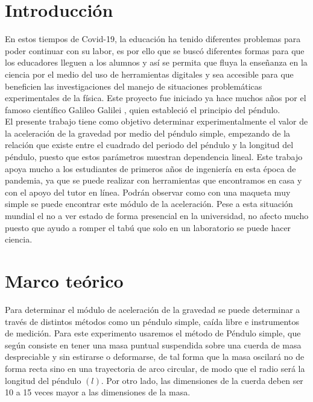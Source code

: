 \documentclass[10pt,a4paper]{article}
\begin{document}
\begin{multicols}{2}
	\section{Introducción}
En estos tiempos de Covid-19, la educación ha tenido diferentes problemas para poder continuar con su labor, es por ello que se buscó diferentes formas para que los educadores lleguen a los alumnos y así se permita que fluya la enseñanza en la ciencia por el medio del uso de herramientas digitales y sea accesible para que beneficien las investigaciones del manejo de situaciones problemáticas experimentales de la física. Este proyecto fue iniciado ya hace muchos años por el famoso científico Galileo Galilei \cite{cespedesprimer}, quien estableció el principio del péndulo.\\
El presente trabajo tiene como objetivo determinar experimentalmente el valor de la aceleración de la gravedad por medio del péndulo simple, empezando de la relación que existe entre el cuadrado del periodo del péndulo y la longitud del péndulo, puesto que estos parámetros muestran dependencia lineal. Este trabajo apoya mucho a los estudiantes de primeros años de ingeniería en esta época de pandemia, ya que se puede realizar con herramientas que encontramos en casa y con el apoyo del tutor en línea. Podrán observar como con una maqueta muy simple se puede encontrar este módulo de la aceleración. Pese a esta situación mundial el no a ver estado de forma presencial en la universidad, no afecto mucho puesto que ayudo a romper el tabú que solo en un laboratorio se puede hacer ciencia.

\section{Marco teórico}

Para determinar el módulo de aceleración de la gravedad se puede determinar a través de distintos métodos como un péndulo simple, caída libre e instrumentos de medición. Para este experimento usaremos el método de Péndulo simple, que según \cite{sears1986fisica} consiste en tener una masa puntual suspendida sobre una cuerda de masa despreciable y sin estirarse o deformarse, de tal forma que la masa oscilará no de forma recta sino en una trayectoria de arco circular, de modo que el radio será la longitud del péndulo $(l)$. Por otro lado, las dimensiones de la cuerda deben ser 10 a 15 veces mayor a las dimensiones de la masa.\\\vspace{1mm}


\end{multicols}
\end{document}
